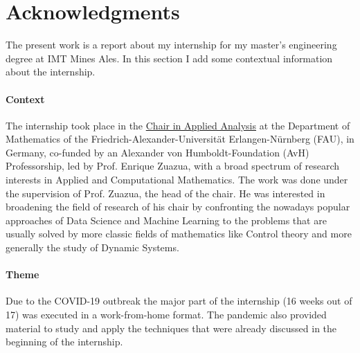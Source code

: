 \documentclass[12pt, letterpaper]{article}
\begin{document}
\section*{Acknowledgments}
\label{sec:acknowledgments}

The present work is a report about my internship for my master's engineering degree at IMT Mines Ales. In this section I add some contextual information about the internship.

\paragraph{Context} The internship took place in the \href{https://en.www.math.fau.de/applied-analysis/}{Chair 
in Applied Analysis} at the Department of Mathematics of the Friedrich-Alexander-Universität Erlangen-Nürnberg (FAU), in Germany, co-funded by an Alexander von Humboldt-Foundation (AvH) Professorship, led by Prof. Enrique Zuazua, with a broad spectrum of research interests in Applied and Computational Mathematics. 
The work was done under the supervision of Prof. Zuazua, the head of the chair. 
He was interested in broadening the field of research of his chair by confronting the nowadays popular approaches of Data Science and Machine Learning to the problems that are usually solved by more classic fields of mathematics like Control theory and more generally the study of Dynamic Systems. 

\paragraph{Theme} Due to the COVID-19 outbreak the major part of the internship (16 weeks out of 17) was executed in a work-from-home format. 
The pandemic also provided material to study and apply the techniques that were already discussed in the beginning of the internship.
 
\end{document}
